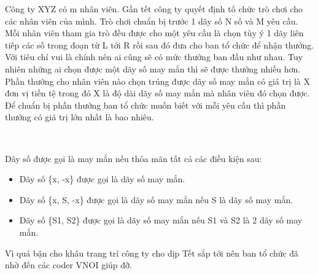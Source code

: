 Công ty XYZ có m nhân viên. Gần tết công ty quyết định tố chức trò chơi cho các nhân viên của mình. Trò chơi chuẩn bị trước 1 dãy số N số và M yêu cầu. Mỗi nhân viên tham gia trò đều được cho một yêu cầu là chọn tùy ý 1 dãy liên tiếp các số trong đoạn từ L tới R rồi sau đó đưa cho ban tổ chức để nhận thưởng. Với tiêu chí vui là chính nên ai cũng sẽ có mức thưởng ban đầu như nhau. Tuy nhiên những ai chọn được một dãy số may mắn thì sẽ được thưởng nhiều hơn. Phần thưởng cho nhân viên nào chọn trúng được dãy số may mắn có giá trị là X đơn vị tiền tệ trong đó X là độ dài dãy số may mắn mà nhân viên đó chọn được. Để chuẩn bị phần thưởng ban tổ chức muốn biết với mỗi yêu cầu thì phần thưởng có giá trị lớn nhất là bao nhiêu.

 

Dãy số được gọi là may mắn nếu thỏa mãn tất cả các điều kiện sau:
\begin{itemize}
	\item 

Dãy số \{x, -x\} được gọi là dãy số may mắn.
\end{itemize}
\begin{itemize}
	\item 

Dãy số \{x, S, -x\} được gọi là dãy số may mắn nếu S là dãy số may mắn.
\end{itemize}
\begin{itemize}
	\item 

Dãy số \{S1, S2\} được gọi là dãy số may mắn nếu S1 và S2 là 2 dãy số may mắn.
\end{itemize}

Vì quá bận cho khâu trang trí công ty cho dịp Tết sắp tới nên ban tổ chức đã nhờ đến các coder VNOI giúp đỡ.